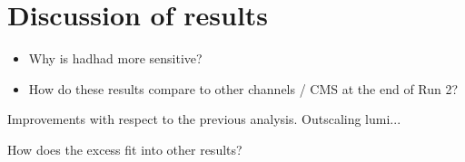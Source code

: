 \section{Discussion of results}%
\label{sec:result_discussion}



\begin{itemize}
\item Why is hadhad more sensitive?
\item How do these results compare to other channels / CMS at the end of Run 2?
\end{itemize}

Improvements with respect to the previous analysis. Outscaling lumi...


How does the excess fit into other results?


